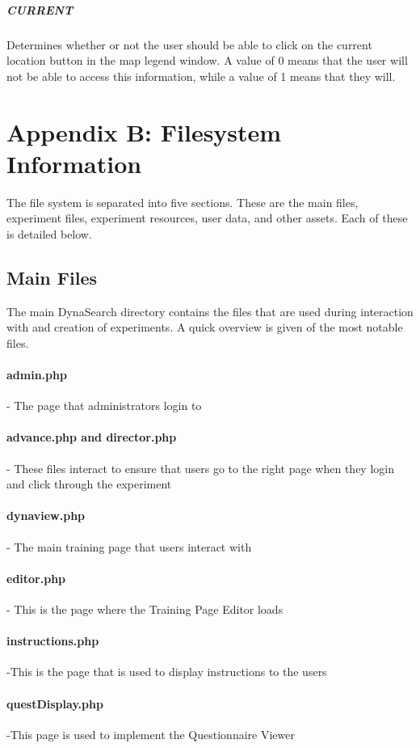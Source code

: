 \documentclass[article]{ij4uq}              %
\begin{document}
\subparagraph{CURRENT}
Determines whether or not the user should be able to click on the current location button in the map legend window. A value of 0 means that the user will not be able to access this information, while a value of 1 means that they will.

\section{Appendix B: Filesystem Information}
The file system is separated into five sections. These are the main files, experiment files, experiment resources, user data, and other assets. Each of these is detailed below.

\subsection{Main Files}
The main DynaSearch directory contains the files that are used during interaction with and creation of experiments. A quick overview is given of the most notable files.

\paragraph{admin.php} - The page that administrators login to

\paragraph{advance.php and director.php} - These files interact to ensure that users go to the right page when they login and click through the experiment

\paragraph{dynaview.php} - The main training page that users interact with

\paragraph{editor.php} - This is the page where the Training Page Editor loads

\paragraph{instructions.php} -This is the page that is used to display instructions to the users 

\paragraph{questDisplay.php} -This page is used to implement the Questionnaire Viewer
\end{document}
